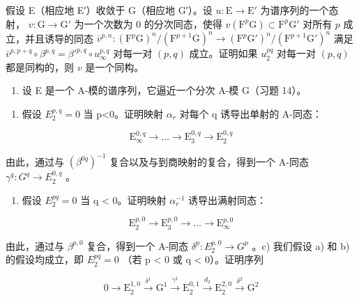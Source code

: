 假设 E（相应地 E′）收敛于 G（相应地 G′）。设 \(u: \mathrm{E} \to \mathrm{E}'\) 为谱序列的一个态射， \(v: \mathrm{G} \to \mathrm{G}'\) 为一个次数为 0 的分次同态，使得 \(v(\mathrm{F}^p \mathrm{G}) \subset \mathrm{F}^p \mathrm{G}'\) 对所有 \(p\) 成立，并且诱导的同态 \(\bar{v}^{p,n}: (\mathrm{F}^p \mathrm{G})^n / (\mathrm{F}^{p+1} \mathrm{G})^n \to (\mathrm{F}^p \mathrm{G}')^n / (\mathrm{F}^{p+1} \mathrm{G}')^n\) 满足 \(\bar{v}^{p,p+q} \circ \beta^{p,q} = \beta'^{p,q} \circ u_{\infty}^{p,q}\) 对每一对 \((p, q)\) 成立。证明如果 \(u_2^{pq}\) 对每一对 \((p, q)\) 都是同构的，则 \(v\) 是一个同构。

\begin{enumerate}
\def\labelenumi{\arabic{enumi})}
\setcounter{enumi}{14}
\tightlist
\item
  设 E 是一个 A-模的谱序列，它逼近一个分次 A-模 G（习题 14）。
\end{enumerate}

\begin{enumerate}
\def\labelenumi{\alph{enumi})}
\tightlist
\item
  假设 \(E_{2}^{p,q}=0\) 当 p\textless0。证明映射 \(\alpha_{r}\) 对每个 q 诱导出单射的 A-同态：
\end{enumerate}

\[
\mathrm{E} _ {\infty} ^ {0, q} \rightarrow \dots \rightarrow \mathrm{E} _ {3} ^ {0, q} \rightarrow \mathrm{E} _ {2} ^ {0, q}
\]

由此，通过与 \((\beta^{0q})^{-1}\) 复合以及与到商映射的复合，得到一个 A-同态 \(\gamma^q: G^q \to E_2^{0,q}\) 。

\begin{enumerate}
\def\labelenumi{\alph{enumi})}
\setcounter{enumi}{1}
\tightlist
\item
  假设 \(E_{2}^{pq} = 0\) 当 q \textless{} 0。证明映射 \(\alpha_{r}^{-1}\) 诱导出满射同态：
\end{enumerate}

\[
\mathrm{E} _ {2} ^ {p, 0} \rightarrow \mathrm{E} _ {3} ^ {p, 0} \rightarrow \dots \rightarrow \mathrm{E} _ {\infty} ^ {p, 0}
\]

由此，通过与 \(\beta^{p,0}\) 复合，得到一个 A-同态 \(\delta^p:E_2^{p,0}\to G^p\) 。c) 我们假设 a) 和 b) 的假设均成立，即 \(E_{2}^{pq} = 0\) （若 p \textless{} 0 或 q \textless{} 0）。证明序列

\[
0 \rightarrow \mathrm{E} _ {2} ^ {1, 0} \xrightarrow {\delta^ {1}} \mathrm{G} ^ {1} \xrightarrow {\gamma^ {1}} \mathrm{E} _ {2} ^ {0, 1} \xrightarrow {d _ {2}} \mathrm{E} _ {2} ^ {2, 0} \xrightarrow {\delta^ {2}} \mathrm{G} ^ {2}
\]

